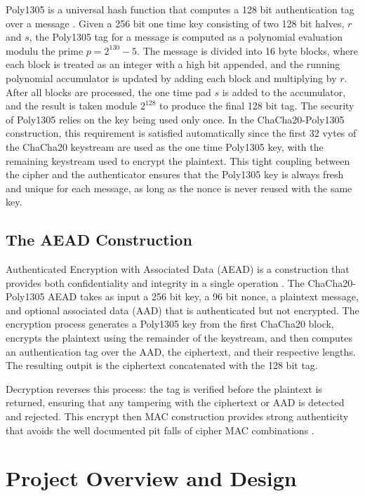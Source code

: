 \documentclass[12pt]{article}
\begin{document}
        Poly1305 is a universal hash function that computes a 128 bit authentication tag over a message \cite{bernstein2005}. Given a 256 bit one time key consisting of two 128 bit halves, $r$ and $s$, the Poly1305 tag for a message is computed as a polynomial evaluation modulu the prime $p = 2^{130} - 5$. The message is divided into 16 byte blocks, where each block is treated as an integer with a high bit appended, and the running polynomial accumulator is updated by adding each block and multiplying by $r$. After all blocks are processed, the one time pad $s$ is added to the accumulator, and the result is taken module $2^{128}$ to produce the final 128 bit tag. The security of Poly1305 relies on the key being used only once. In the ChaCha20-Poly1305 construction, this requirement is satisfied automatically since the first 32 vytes of the ChaCha20 keystream are used as the one time Poly1305 key, with the remaining keystream used to encrypt the plaintext. This tight coupling between the cipher and the authenticator ensures that the Poly1305 key is always fresh and unique for each message, as long as the nonce is never reused with the same key. 

    \subsection{The AEAD Construction}

        Authenticated Encryption with Associated Data (AEAD) is a construction that provides both confidentiality and integrity in a single operation \cite{rfc8439}. The ChaCha20-Poly1305 AEAD takes as input a 256 bit key, a 96 bit nonce, a plaintext message, and optional associated data (AAD) that is authenticated but not encrypted. The encryption process generates a Poly1305 key from the first ChaCha20 block, encrypts the plaintext using the remainder of the keystream, and then computes an authentication tag over the AAD, the ciphertext, and their respective lengths. The resulting outpit is the ciphertext concatenated with the 128 bit tag. 

        Decryption reverses this process: the tag is verified before the plaintext is returned, ensuring that any tampering with the ciphertext or AAD is detected and rejected. This encrypt then MAC construction provides strong authenticity that avoids the well documented pit falls of cipher MAC combinations \cite{procter2014}. 

\section{Project Overview and Design}
\end{document}
